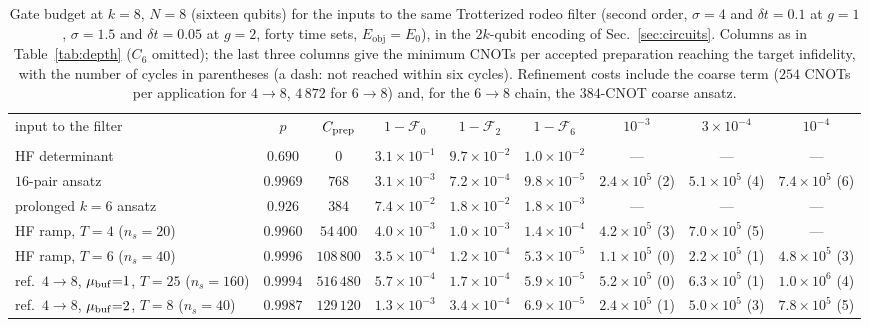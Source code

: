 \documentclass[
  aps,            %
  prc,            %
  reprint,        %
  superscriptaddress,
  floatfix,
  nofootinbib
]{revtex4-2}
\newcommand{\Eobj}{E_{\mathrm{obj}}}
\begin{document}
\begin{table}[t]
\caption{\label{tab:largebudget}Gate budget at $k=8$, $N=8$ (sixteen
qubits) for the inputs to the same Trotterized rodeo filter (second order,
$\sigma=4$ and $\delta t=0.1$ at $g=1$, $\sigma=1.5$ and $\delta t=0.05$ at
$g=2$, forty time sets, $\Eobj=E_0$), in the $2k$-qubit encoding of
Sec.~\ref{sec:circuits}.  Columns as in Table~\ref{tab:depth} ($C_6$ omitted); the last
three columns give the minimum CNOTs per accepted preparation reaching the
target infidelity, with the number of cycles in parentheses (a dash: not
reached within six cycles).  Refinement costs include the coarse term
($254$ CNOTs per application for $4\to8$, $4\,872$ for $6\to8$) and, for the
$6\to8$ chain, the $384$-CNOT coarse ansatz.}
\scriptsize
\begin{ruledtabular}
\begin{tabular}{lcc ccc ccc}
input to the filter & $p$ & $C_{\rm prep}$ & $1-\mathcal F_0$ & $1-\mathcal F_2$ & $1-\mathcal F_6$ & $10^{-3}$ & $3\times10^{-4}$ & $10^{-4}$\\
\colrule
\multicolumn{9}{l}{$g=1$ ($E_0=8.88917$, cycle $1.2\times10^{5}$ CNOTs)}\\
HF determinant & $0.690$ & $0$ & $3.1\times10^{-1}$ & $9.7\times10^{-2}$ & $1.0\times10^{-2}$ & --- & --- & ---\\
$16$-pair ansatz & $0.9969$ & $768$ & $3.1\times10^{-3}$ & $7.2\times10^{-4}$ & $9.8\times10^{-5}$ & $2.4\times10^{5}$ (2) & $5.1\times10^{5}$ (4) & $7.4\times10^{5}$ (6)\\
prolonged $k{=}6$ ansatz & $0.926$ & $384$ & $7.4\times10^{-2}$ & $1.8\times10^{-2}$ & $1.8\times10^{-3}$ & --- & --- & ---\\
HF ramp, $T{=}4$ ($n_s{=}20$) & $0.9960$ & $54\,400$ & $4.0\times10^{-3}$ & $1.0\times10^{-3}$ & $1.4\times10^{-4}$ & $4.2\times10^{5}$ (3) & $7.0\times10^{5}$ (5) & ---\\
HF ramp, $T{=}6$ ($n_s{=}40$) & $0.9996$ & $108\,800$ & $3.5\times10^{-4}$ & $1.2\times10^{-4}$ & $5.3\times10^{-5}$ & $1.1\times10^{5}$ (0) & $2.2\times10^{5}$ (1) & $4.8\times10^{5}$ (3)\\
ref.\ $4{\to}8$, $\mu_{\rm buf}{=}1$, $T{=}25$ ($n_s{=}160$) & $0.9994$ & $516\,480$ & $5.7\times10^{-4}$ & $1.7\times10^{-4}$ & $5.9\times10^{-5}$ & $5.2\times10^{5}$ (0) & $6.3\times10^{5}$ (1) & $1.0\times10^{6}$ (4)\\
ref.\ $4{\to}8$, $\mu_{\rm buf}{=}2$, $T{=}8$ ($n_s{=}40$) & $0.9987$ & $129\,120$ & $1.3\times10^{-3}$ & $3.4\times10^{-4}$ & $6.9\times10^{-5}$ & $2.4\times10^{5}$ (1) & $5.0\times10^{5}$ (3) & $7.8\times10^{5}$ (5)\\

\end{tabular}
\end{ruledtabular}
\end{table}
\end{document}
